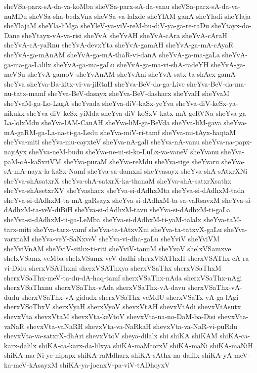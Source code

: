 {sheVSa-parx-sA-da-va-koMba
sheVSa-parx-sA-da-vanu
sheVSa-parx-sA-da-va-nuMDu
sheVSa-sha-bedxVna
sheVSa-va-lalxde
sheYlAM-ganA
sheYladi
sheYlaja
sheYlajaM
sheYla-liMga
sheYleV-ya-viV-reM-bu-diV-ya-ga-re-raDu
sheYtayx-do-Dane
sheYtayx-vA-va-risi
sheYvA
sheYvAH
sheYvA-cAra
sheYvA-cAraH
sheYvA-cA-yaRnu
sheYvA-devxYta
sheYvA-gamAH
sheYvA-ga-mA-cAyaR
sheYvA-ga-mAnAM
sheYvA-ga-mA-thaR-vi-danA
sheYvA-ga-ma-gaLa
sheYvA-ga-ma-ga-Lalilx
sheYvA-ga-ma-gaLu
sheYvA-ga-ma-vi-shA-radeYH
sheYvA-ga-meVSu
sheYvA-gamoV
sheYvAnAM
sheYvAni
sheYvA-satx-ta-shAcx-gamA
sheYva
sheYva-Ba-kitx-vi-va-jiRtaH
sheYva-BeV-da-ga-Live
sheYva-BeV-da-ma-nu-tatx-mamf
sheYva-BeV-dasayx
sheYva-BeV-dashacx
sheYvaH
sheYvaM
sheYvaM-ga-Lo-LagA
sheYvada
sheYva-diV-kaSx-yeYva
sheYva-diV-keSx-ya-nikukx
sheYva-diV-keSx-yiMda
sheYva-diV-koSxV-katx-mA-geRVNa
sheYva-ga-La-lolxMdu
sheYva-lAM-CanAH
sheYva-liM-ga-BeVda
sheYva-liM-gava
sheYva-mA-gaRM-ga-La-na-ti-ga-Ledu
sheYva-miV-ri-tamf
sheYva-mi-tAyx-haqtaM
sheYva-miti
sheYva-mu-cayxteV
sheYva-nA-gali
sheYva-nA-vanu
sheYva-na-papx-nayAyx
sheYva-neM-budu
sheYva-ne-ni-si-ko-LuLx-va-vaneV
sheYvanu
sheYva-paM-cA-kaSxriVM
sheYva-puraM
sheYva-reMdu
sheYva-rige
sheYvaru
sheYva-sA-mA-nayx-la-kaSx-Namf
sheYva-sa-damxni
sheYvasayx
sheYva-shA-sAtxrXNi
sheYva-shAsatxrX
sheYva-shA-satxrX-ka-thanaM
sheYva-shA-satxrXsathx
sheYva-shAsetxrXV
sheYvashacx
sheYva-si-dAdhxMta
sheYva-si-dAdhxM-tada
sheYva-si-dAdhxM-ta-mA-gaRsayx
sheYva-si-dAdhxM-ta-sa-vaRsavxM
sheYva-si-dAdhxM-ta-veV-diBiH
sheYva-si-dAdhxM-tavu
sheYva-si-dAdhxM-ti-gaLa
sheYva-si-dAdhxM-ti-ga-LeMba
sheYva-si-dAdhxM-ti-yaM-talalx
sheYva-taM-tarx-miti
sheYva-tarx-yamf
sheYva-ta-tAtxvXni
sheYva-ta-tatxvX-gaLu
sheYva-varxtaM
sheYva-veY-SaNxveV
sheYva-vi-dha-gaLu
sheYviV
sheYviVM
sheYviVnAM
sheYviV-sithx-ti-riti
sheYviV-tanuM
sheYvoV
shelxVSamxve
shelxVSamx-veMba
shelxVSamx-veV-dadhi
sherxVSAThxH
sherxVSAThx-cA-ra-vi-Didu
sherxVSAThxni
sherxVSAThxya
sherxVSaThx
sherxVSaThxM
sherxVSaThx-meV-ta-du-dA-haq-tamf
sherxVSaThx-nAda
sherxVSaThx-nAgi
sherxVSaThxnu
sherxVSaThx-vAda
sherxVSaThx-vA-davu
sherxVSaThx-vA-dudu
sherxVSaThx-vA-gidudx
sherxVSaThx-veMdU
sherxVSaTx-vA-ga-lAgi
sherxVSoThxV
sherxVyaH
sherxVyoV
shevxVtAH
shevxVtAdi
shevxVtAsutx
shevxVta
shevxVtaM
shevxVta-keVtoV
shevxVta-na-no-DaM-ba-Disi
shevxVta-vaNaR
shevxVta-vaNaRH
shevxVta-va-NaRkaH
shevxVta-va-NaR-vi-puRdu
shevxVta-va-satxrX-dhAri
shevxVtoV
sheya-dilalx
shi
shiKA
shiKAM
shiKA-ca-karx-dalilx
shiKA-ca-karx-da-lilxya
shiKA-maMtorxV
shiKA-maNi
shiKA-maNiH
shiKA-ma-Ni-ye-nipapx
shiKA-raMdharx
shiKA-sAthx-na-dalilx
shiKA-yA-meV-ka-meV-kAsayxM
shiKA-ya-jocnxV-pa-viV-tADhoyxV
}
